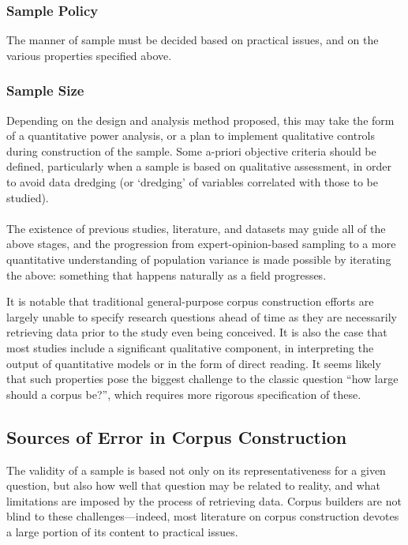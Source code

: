 \subsubsection{Sample Policy}
The manner of sample must be decided based on practical issues, and on the various properties specified above.

\subsubsection{Sample Size}
Depending on the design and analysis method proposed, this may take the form of a quantitative power analysis, or a plan to implement qualitative controls during construction of the sample.  Some a-priori objective criteria should be defined, particularly when a sample is based on qualitative assessment, in order to avoid data dredging (or `dredging' of variables correlated with those to be studied).

\paragraph{}
The existence of previous studies, literature, and datasets may guide all of the above stages, and the progression from expert-opinion-based sampling to a more quantitative understanding of population variance is made possible by iterating the above: something that happens naturally as a field progresses.

It is notable that traditional general-purpose corpus construction efforts are largely unable to specify research questions ahead of time as they are necessarily retrieving data prior to the study even being conceived.  It is also the case that most studies include a significant qualitative component, in interpreting the output of quantitative models or in the form of direct reading\cite{rayson2008keysem}.
It seems likely that such properties pose the biggest challenge to the classic question ``how large should a corpus be?'', which requires more rigorous specification of these.






\subsection{Sources of Error in Corpus Construction}
The validity of a sample is based not only on its representativeness for a given question, but also how well that question may be related to reality, and what limitations are imposed by the process of retrieving data.
Corpus builders are not blind to these challenges---indeed, most literature on corpus construction devotes a large portion of its content to practical issues\cite{wynne2005developing,atkins1992corpus,EagTcwgCtypeaglespreliminary}.

